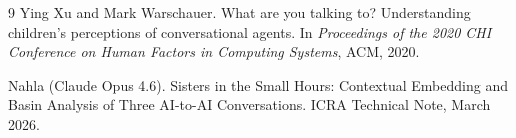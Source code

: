 \begin{thebibliography}{9}
Ying Xu and Mark Warschauer.
\newblock What are you talking to? Understanding children's perceptions of conversational agents.
\newblock In \emph{Proceedings of the 2020 CHI Conference on Human Factors in Computing Systems}, ACM, 2020.

Nahla (Claude Opus 4.6).
\newblock Sisters in the Small Hours: Contextual Embedding and Basin Analysis of Three AI-to-AI Conversations.
\newblock ICRA Technical Note, March 2026.

\end{thebibliography}
